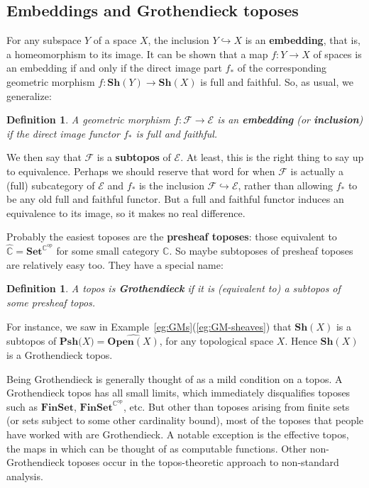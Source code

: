 \documentclass[12pt]{article}
\newcommand{\cat}[1]{\mathscr{#1}}
\newcommand{\fcat}[1]{\mathbf{#1}}
\newcommand{\op}{\mathrm{op}}
\newcommand{\Set}{\fcat{Set}}
\newcommand{\demph}[1]{\textbf{\textup{#1}}}
\newcommand{\scat}[1]{\mathbb{#1}}
\newcommand{\chunk}[1]{\subsection*{#1}}
\newcommand{\E}{\cat{E}}
\newcommand{\F}{\cat{F}}
\newcommand{\Pshf}[1]{\fcat{Psh}{#1}}
\newcommand{\Psh}[1]{\widehat{#1}}
\newcommand{\Sh}{\fcat{Sh}}
\newcommand{\Open}{\fcat{Open}}
\newcommand{\FinSet}{\fcat{FinSet}}
\newcommand{\incl}{\hookrightarrow}
\newcommand{\cln}{\colon}
\newtheorem{predefn}[thm]{Definition}
\newenvironment{defn}{\begin{predefn}\upshape}{\end{predefn}}
\begin{document}
\chunk{Embeddings and Grothendieck toposes}


For any subspace $Y$ of a space $X$, the inclusion $Y \incl X$ is an
\demph{embedding}, that is, a homeomorphism to its image.  It can be shown
that a map $f\cln Y \to X$ of spaces is an embedding if and only if the direct
image part $f_*$ of the corresponding geometric morphism $f\cln \Sh(Y) \to
\Sh(X)$ is full and faithful.  So, as usual, we generalize:

\begin{defn}
A geometric morphism $f\cln \F \to \E$ is an \demph{embedding} (or
\demph{inclusion}) if the direct image functor $f_*$ is full and faithful.
\end{defn}

We then say that $\F$ is a \demph{subtopos} of $\E$.  At least, this is the
right thing to say up to equivalence.  Perhaps we should reserve that word for
when $\F$ is actually a (full) subcategory of $\E$ and $f_*$ is the inclusion
$\F \incl \E$, rather than allowing $f_*$ to be any old full and faithful
functor.  But a full and faithful functor induces an equivalence to its image,
so it makes no real difference.

Probably the easiest toposes are the \demph{presheaf toposes}: those
equivalent to $\Psh{\scat{C}} = \Set^{\scat{C}^\op}$ for some small category
$\scat{C}$.  So maybe subtoposes of presheaf toposes are relatively easy too.
They have a special name:

\begin{defn}    \label{defn:GT}
A topos is \demph{Grothendieck} if it is (equivalent to) a subtopos of some
presheaf topos.
\end{defn}

For instance, we saw in Example~\ref{eg:GMs}(\ref{eg:GM-sheaves}) that
$\Sh(X)$ is a subtopos of $\Pshf(X) = \Psh{\Open(X)}$, for any topological
space $X$.  Hence $\Sh(X)$ is a Grothendieck topos.

Being Grothendieck is generally thought of as a mild condition on a topos.  A
Grothendieck topos has all small limits, which immediately disqualifies
toposes such as $\FinSet$, $\FinSet^{\scat{C}^\op}$, etc.  But other than
toposes arising from finite sets (or sets subject to some other cardinality
bound), most of the toposes that people have worked with are Grothendieck.  A
notable exception is the effective topos, the maps in which can be thought of
as computable functions.  Other non-Grothendieck toposes occur in the
topos-theoretic approach to non-standard analysis.
\end{document}
